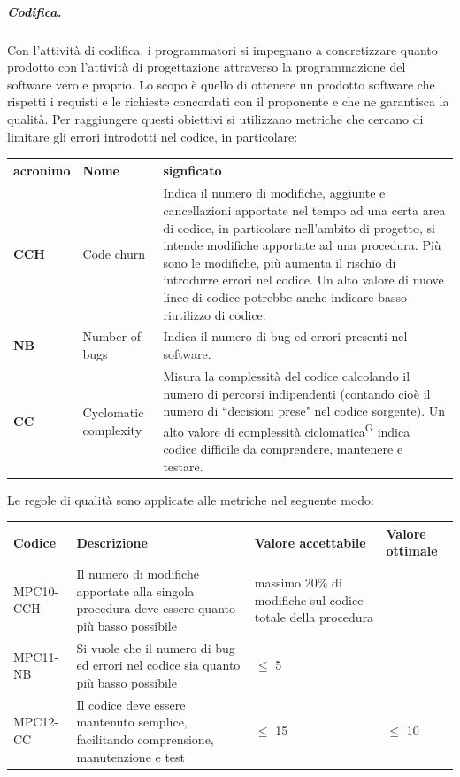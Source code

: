 \subparagraph{Codifica.}
Con l'attività di codifica, i programmatori si impegnano a concretizzare quanto prodotto con l'attività di progettazione attraverso la programmazione del software vero e proprio.
Lo scopo è quello di ottenere un prodotto software che rispetti i requisti e le richieste concordati con il proponente e che ne garantisca la qualità. Per raggiungere questi obiettivi si utilizzano metriche che cercano di limitare gli errori introdotti nel codice, in particolare:
\begin{table}[h!]
\centering
\def\arraystretch{1.5}
\begin{tabular}{ |m{2cm}|m{2.5cm}|m{9.5cm}| }
\hline
\rowcolor{lightgray!30}
\textbf{acronimo} & \textbf{Nome} & \textbf{signficato}\\
\hline
\textbf{CCH} & Code churn & Indica il numero di modifiche, aggiunte e cancellazioni apportate nel tempo ad una certa area di codice, in particolare nell'ambito di progetto, si intende modifiche apportate ad una procedura. Più sono le modifiche, più aumenta il rischio di introdurre errori nel codice. Un alto valore di nuove linee di codice potrebbe anche indicare basso riutilizzo di codice.\\
\hline
\textbf{NB} & Number of bugs & Indica il numero di bug ed errori presenti nel software.\\
\hline
\textbf{CC} & Cyclomatic complexity & Misura la complessità del codice calcolando il numero di percorsi indipendenti (contando cioè il numero di ``decisioni prese" nel codice sorgente). Un alto valore di complessità ciclomatica\textsuperscript{G} indica codice difficile da comprendere, mantenere e testare.\\
\hline
\end{tabular}
\end{table}
\par Le regole di qualità sono applicate alle metriche nel seguente modo:
\begin{table}[h!]
\centering
\def\arraystretch{1.5}
\begin{tabular}{ |>{\centering\arraybackslash}m{2.5cm}|>{\centering\arraybackslash}m{5.5cm}|>{\centering\arraybackslash}m{3cm}|>{\centering\arraybackslash}m{3cm}| }
\hline
\rowcolor{black}
\textbf{\color{white} Codice} & \textbf{\color{white} Descrizione} & \textbf{\color{white} Valore accettabile} & \textbf{\color{white} Valore ottimale}\\
\hline
MPC10-CCH & Il numero di modifiche apportate alla singola procedura deve essere quanto più basso possibile & massimo 20\% di modifiche sul codice totale della procedura & 0 \\
\hline
MPC11-NB & Si vuole che il numero di bug ed errori nel codice sia quanto più basso possibile & $\leq$ 5 & 0 \\
\hline
MPC12-CC & Il codice deve essere mantenuto semplice, facilitando comprensione, manutenzione e test & $\leq$ 15 & $\leq$ 10 \\
\hline
\end{tabular}
\end{table}

